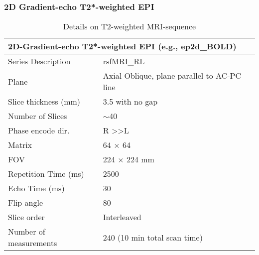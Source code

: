 \documentclass[
	a4paper, 
	11.5pt,
	headings=small, 
	twoside, 
	titlepage=firstiscover, 
 	pagesize=auto,
  	version=last,
	open=any,
	BCOR=14mm,
  	chapterprefix=false]{scrbook}
\begin{document}
\subsubsection{2D Gradient-echo T2*-weighted EPI}
\begin{table}[H]
\caption{Details on T2-weighted \ac{MRI}-sequence}
\begin{tabularx}{1\textwidth}{@{}X *{1}{X}@{}}
\toprule
\multicolumn{2}{l}{\textbf{2D-Gradient-echo T2*-weighted \ac{EPI} (e.g., ep2d\_BOLD)}} \\
\midrule                                                                                                                                                                                                                                                                                                                                                                                                                                                                                                                                                                                                                                                                                                                          
Series Description                                				& rsfMRI\_RL \\
Plane                                             					& Axial Oblique, plane parallel to AC-PC line \\
Slice thickness (mm)                              				& 3.5 with no gap \\
Number of Slices                                  				& $\sim$40 \\
Phase encode dir.                                 				& R \textgreater{}\textgreater L\\
Matrix                                            					& 64 $\times$ 64 \\
FOV                                               						& 224 $\times$ 224 mm \\
Repetition Time (ms)                              				& 2500 \\
Echo Time (ms)                                    				& 30 \\
Flip angle                                        					& 80 \\
Slice order                                       					& Interleaved \\
Number of measurements                            			& 240 (10 min total scan time) \\

\end{tabularx}
\end{table}
\end{document}
